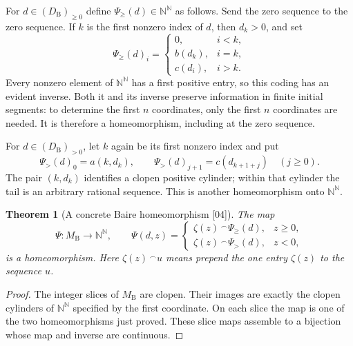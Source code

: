 \documentclass[11pt]{article}
\numberwithin{equation}{section}
\newtheorem{theorem}{Theorem}[section]
\theoremstyle{definition}
\theoremstyle{remark}
\newcommand{\N}{\mathbb N}
\newcommand{\Baire}{\N^{\N}}
\newcommand{\MB}{M_{\mathrm B}}
\newcommand{\src}[1]{\textup{\textsf{\small[#1]}}}
\begin{document}
For $d\in(D_{\mathrm B})_{\geq0}$ define $\Psi_{\geq}(d)\in\Baire$ as follows.
Send the zero sequence to the zero sequence. If $k$ is the first nonzero
index of $d$, then $d_k>0$, and set
\begin{equation}\label{pma:pr:eq:nonnegativecode}
 \Psi_{\geq}(d)_i=
 \begin{cases}
 0,&i<k,\\
 b(d_k),&i=k,\\
 c(d_i),&i>k.
 \end{cases}
\end{equation}
Every nonzero element of $\Baire$ has a first positive entry, so this coding
has an evident inverse. Both it and its inverse preserve information in
finite initial segments: to determine the first $n$ coordinates, only the
first $n$ coordinates are needed. It is therefore a homeomorphism, including
at the zero sequence.

For $d\in(D_{\mathrm B})_{>0}$, let $k$ again be its first nonzero index and put
\begin{equation}\label{pma:pr:eq:positivecode}
 \Psi_{>}(d)_0=a(k,d_k),\qquad
 \Psi_{>}(d)_{j+1}=c(d_{k+1+j})\quad(j\geq0).
\end{equation}
The pair $(k,d_k)$ identifies a clopen positive cylinder; within that
cylinder the tail is an arbitrary rational sequence. This is another
homeomorphism onto $\Baire$.

\begin{theorem}[A concrete Baire homeomorphism \src{04}]\label{pma:pr:s04:thm:baire}
The map
\begin{equation}\label{pma:pr:eq:bairehomeo}
 \Psi:\MB\longrightarrow\Baire,\qquad
 \Psi(d,z)=
 \begin{cases}
 \zeta(z)\,{}^\frown \Psi_{\geq}(d),&z\geq0,\\
 \zeta(z)\,{}^\frown \Psi_{>}(d),&z<0,
 \end{cases}
\end{equation}
is a homeomorphism. Here $\zeta(z)\,{}^\frown u$ means prepend the one entry
$\zeta(z)$ to the sequence $u$.
\end{theorem}

\begin{proof}
The integer slices of $\MB$ are clopen. Their images are exactly the clopen
cylinders of $\Baire$ specified by the first coordinate. On each slice the map
is one of the two homeomorphisms just proved. These slice maps assemble to
a bijection whose map and inverse are continuous.
\end{proof}
\end{document}
